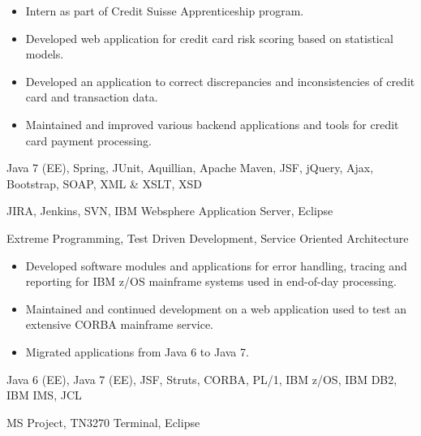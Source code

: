 \medskip
\begin{itemize}
	\item Intern as part of Credit Suisse Apprenticeship program.
	\item Developed web application for credit card risk scoring based on statistical models.
	\item Developed an application to correct discrepancies and inconsistencies of credit card and transaction data.
	\item Maintained and improved various backend applications and tools for credit card payment processing.
\end{itemize}

\medskip
\begin{description}
	\ifincludestech
	\item [Technologies] Java 7 (EE), Spring, JUnit, Aquillian, Apache Maven, JSF, jQuery, Ajax, Bootstrap, SOAP, XML \& XSLT, XSD
	\fi
	\ifincludestools
	\item [Tools] JIRA, Jenkins, SVN, IBM Websphere Application Server, Eclipse
	\fi
	\ifincludesmethods
	\item [Methodologies] Extreme Programming, Test Driven Development, Service Oriented Architecture
	\fi
\end{description}

\divider


\medskip
\begin{itemize}
	\item Developed software modules and applications for error handling, tracing and reporting for IBM z/OS mainframe systems used in end-of-day processing.
	\item Maintained and continued development on a web application used to test an extensive CORBA mainframe service.
	\item Migrated applications from Java 6 to Java 7.
\end{itemize}

\medskip
\begin{description}
	\ifincludestech
	\item [Technologies] Java 6 (EE), Java 7 (EE), JSF, Struts, CORBA, PL/1, IBM z/OS, IBM DB2, IBM IMS, JCL
	\fi
	\ifincludestools
	\item [Tools] MS Project, TN3270 Terminal, Eclipse
	\fi
\end{description}
